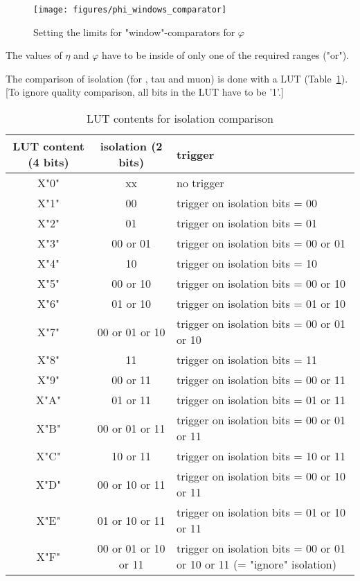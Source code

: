 \begin{figure}[htb]
\centering
\texttt{[image: figures/phi\_windows\_comparator]}
\caption{Setting the limits for "window"-comparators for $\varphi$}
\label{fig:gtl:phi_windows_comparator}
\end{figure}

The values of $\eta$ and $\varphi$ have to be inside of only one of the required ranges ("or").

\clearpage

The comparison of isolation (for \egamma, tau and muon) is done with a LUT (Table~\ref{tab:gtl:lut_iso}). [To ignore quality comparison, all bits in the LUT have to be '1'.]

\begin{table}[htdp]
\begin{center}
\begin{tabular}{|c|c|p{}|}\hline
LUT content (4 bits) & isolation (2 bits) & trigger \\\hline\hline
X"0" & xx & no trigger\\\hline
X"1" & 00 & trigger on isolation bits = 00\\\hline
X"2" & 01 & trigger on isolation bits = 01\\\hline
X"3" & 00 or 01 & trigger on isolation bits = 00 or 01\\\hline
X"4" & 10 & trigger on isolation bits = 10\\\hline
X"5" & 00 or 10 & trigger on isolation bits = 00 or 10\\\hline
X"6" & 01 or 10 & trigger on isolation bits = 01 or 10\\\hline
X"7" & 00 or 01 or 10 & trigger on isolation bits = 00 or 01 or 10\\\hline
X"8" & 11 & trigger on isolation bits = 11\\\hline
X"9" & 00 or 11 & trigger on isolation bits = 00 or 11\\\hline
X"A" & 01 or 11 & trigger on isolation bits = 01 or 11\\\hline
X"B" & 00 or 01 or 11 & trigger on isolation bits = 00 or 01 or 11\\\hline
X"C" & 10 or 11 & trigger on isolation bits = 10 or 11\\\hline
X"D" & 00 or 10 or 11 & trigger on isolation bits = 00 or 10 or 11\\\hline
X"E" & 01 or 10 or 11 & trigger on isolation bits = 01 or 10 or 11\\\hline
X"F" & 00 or 01 or 10 or 11 & trigger on isolation bits = 00 or 01 or 10 or 11 (= "ignore" isolation)\\\hline
\end{tabular}
\end{center}
\caption{LUT contents for isolation comparison}
\label{tab:gtl:lut_iso}
\end{table}

